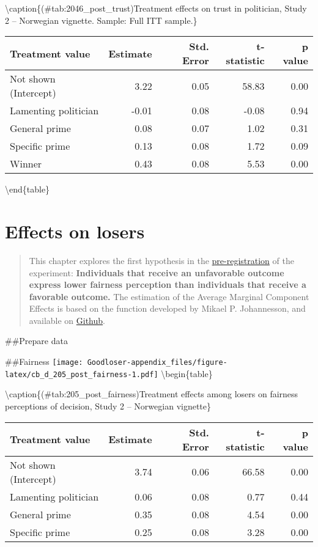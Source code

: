 \documentclass[
]{book}
\begin{document}
\textbackslash caption\{(\#tab:2046\_post\_trust)Treatment effects on trust in politician, Study 2 -- Norwegian vignette. Sample: Full ITT sample.\}
\centering

\begin{tabular}[t]{lrrrr}
\toprule
Treatment value & Estimate & Std. Error & t-statistic & p value\\
\midrule
Not shown (Intercept) & 3.22 & 0.05 & 58.83 & 0.00\\
Lamenting politician & -0.01 & 0.08 & -0.08 & 0.94\\
General prime & 0.08 & 0.07 & 1.02 & 0.31\\
Specific prime & 0.13 & 0.08 & 1.72 & 0.09\\
Winner & 0.43 & 0.08 & 5.53 & 0.00\\
\bottomrule
\end{tabular}

\textbackslash end\{table\}

\hypertarget{effects-on-losers-1}{%
\chapter{Effects on losers}\label{effects-on-losers-1}}

\begin{quote}
This chapter explores the first hypothesis in the \href{GoogLoser_Prereg_3_\#16823\%5B16065\%5D.pdf}{pre-registration} of the experiment: \textbf{Individuals that receive an unfavorable outcome express lower fairness perception than individuals that receive a favorable outcome.} The estimation of the Average Marginal Component Effects is based on the function developed by Mikael P. Johannesson, and available on \href{https://rdrr.io/github/mikajoh/descr2/man/amce.html}{Github}.
\end{quote}

\#\#Prepare data

\#\#Fairness
\texttt{[image: Goodloser-appendix\_files/figure-latex/cb\_d\_205\_post\_fairness-1.pdf]} \textbackslash begin\{table\}

\textbackslash caption\{(\#tab:205\_post\_fairness)Treatment effects among losers on fairness perceptions of decision, Study 2 -- Norwegian vignette\}
\centering

\begin{tabular}[t]{lrrrr}
\toprule
Treatment value & Estimate & Std. Error & t-statistic & p value\\
\midrule
Not shown (Intercept) & 3.74 & 0.06 & 66.58 & 0.00\\
Lamenting politician & 0.06 & 0.08 & 0.77 & 0.44\\
General prime & 0.35 & 0.08 & 4.54 & 0.00\\
Specific prime & 0.25 & 0.08 & 3.28 & 0.00\\
\bottomrule
\end{tabular}
\end{document}
